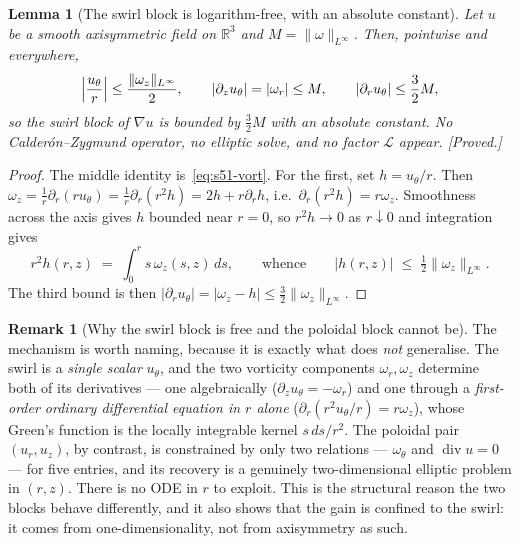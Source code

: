 \documentclass[11pt]{article}
\newtheorem{lemma}[theorem]{Lemma}
\theoremstyle{definition}
\newtheorem{remark}[theorem]{Remark}
\theoremstyle{remark}
\newcommand{\R}{\mathbb{R}}
\newcommand{\divg}{\operatorname{div}}
\begin{document}
\begin{lemma}[The swirl block is logarithm-free, with an absolute constant]
  \label{lem:s51-swirl-block}
  Let $u$ be a smooth axisymmetric field on $\R^3$ and $M=\|\omega\|_{L^\infty}$.
  Then, pointwise and everywhere,
  \begin{equation}\label{eq:s51-swirl-bound}
    \Bigl|\frac{u_\theta}{r}\Bigr| \leq \frac{\|\omega_z\|_{L^\infty}}{2},
    \qquad
    |\partial_zu_\theta| = |\omega_r| \leq M,
    \qquad
    |\partial_ru_\theta| \leq \frac32 M ,
  \end{equation}
  so the swirl block of $\nabla u$ is bounded by $\tfrac32M$ with an absolute
  constant. No Calder\'on--Zygmund operator, no elliptic solve, and no factor
  $\mathcal{L}$ appear. \emph{[Proved.]}
\end{lemma}
\begin{proof}
  The middle identity is~\eqref{eq:s51-vort}. For the first, set
  $h=u_\theta/r$. Then $\omega_z=\tfrac1r\partial_r(ru_\theta)
  =\tfrac1r\partial_r(r^2h)=2h+r\partial_rh$, i.e.\
  $\partial_r(r^2h)=r\omega_z$. Smoothness across the axis gives $h$ bounded
  near $r=0$, so $r^2h\to0$ as $r\downarrow0$ and integration gives
  \[
    r^2h(r,z) \;=\; \int_0^r s\,\omega_z(s,z)\,ds ,
    \qquad\text{whence}\qquad
    |h(r,z)| \;\leq\; \tfrac12\|\omega_z\|_{L^\infty}.
  \]
  The third bound is then
  $|\partial_ru_\theta|=|\omega_z-h|\leq\tfrac32\|\omega_z\|_{L^\infty}$.
\end{proof}

\begin{remark}[Why the swirl block is free and the poloidal block cannot be]
  \label{rem:s51-why}
  The mechanism is worth naming, because it is exactly what does \emph{not}
  generalise. The swirl is a \emph{single scalar} $u_\theta$, and the two
  vorticity components $\omega_r,\omega_z$ determine both of its derivatives
  --- one algebraically ($\partial_zu_\theta=-\omega_r$) and one through a
  \emph{first-order ordinary differential equation in $r$ alone}
  ($\partial_r(r^2u_\theta/r)=r\omega_z$), whose Green's function is the
  locally integrable kernel $s\,ds/r^2$. The poloidal pair $(u_r,u_z)$, by
  contrast, is constrained by only two relations --- $\omega_\theta$ and
  $\divg u=0$ --- for five entries, and its recovery is a genuinely
  two-dimensional elliptic problem in $(r,z)$. There is no ODE in $r$ to
  exploit. This is the structural reason the two blocks behave differently,
  and it also shows that the gain is confined to the swirl: it comes from
  one-dimensionality, not from axisymmetry as such.
\end{remark}
\end{document}
